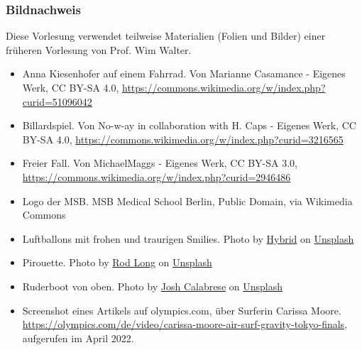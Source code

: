 \documentclass{beamer}
\begin{document}
\begin{frame}
\frametitle{Bildnachweis}
 
Diese Vorlesung verwendet teilweise Materialien (Folien und Bilder) einer früheren Vorlesung von Prof. Wim Walter.  

\vfill

\begin{tiny}
 
\begin{itemize}

\item
Anna Kiesenhofer auf einem Fahrrad. Von Marianne Casamance - Eigenes Werk, CC BY-SA 4.0, \url{https://commons.wikimedia.org/w/index.php?curid=51096042}

\item
Billardspiel. Von No-w-ay in collaboration with H. Caps - Eigenes Werk, CC BY-SA 4.0, \url{https://commons.wikimedia.org/w/index.php?curid=3216565}

\item
Freier Fall. Von MichaelMaggs - Eigenes Werk, CC BY-SA 3.0, \url{https://commons.wikimedia.org/w/index.php?curid=2946486}

\item
Logo der MSB. MSB Medical School Berlin, Public Domain, via Wikimedia Commons

\item
Luftballons mit frohen und traurigen Smilies. Photo by \href{https://unsplash.com/@artbyhybrid?utm_source=unsplash&utm_medium=referral&utm_content=creditCopyText}{Hybrid} on \href{https://unsplash.com/s/photos/feedback?utm_source=unsplash&utm_medium=referral&utm_content=creditCopyText}{Unsplash}
  
\item
Pirouette. Photo by \href{https://unsplash.com/@rodlong?utm_source=unsplash&utm_medium=referral&utm_content=creditCopyText}{Rod Long} on \href{https://unsplash.com/s/photos/figure-skater?utm_source=unsplash&utm_medium=referral&utm_content=creditCopyText}{Unsplash}  

\item
Ruderboot von oben. Photo by \href{https://unsplash.com/@joshcala?utm_source=unsplash&utm_medium=referral&utm_content=creditCopyText}{Josh Calabrese} on \href{https://unsplash.com/s/photos/rowing?utm_source=unsplash&utm_medium=referral&utm_content=creditCopyText}{Unsplash}
  

\item
Screenshot eines Artikels auf olympics.com, über Surferin Carissa Moore. \href{https://olympics.com/de/video/carissa-moore-air-surf-gravity-tokyo-finals}{https://olympics.com/de/video/carissa-moore-air-surf-gravity-tokyo-finals}, aufgerufen im April 2022.


\end{itemize}
\end{tiny}
\end{frame}
\end{document}

